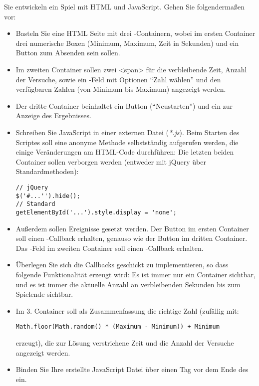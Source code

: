 %
\par Sie entwickeln ein Spiel mit HTML und JavaScript. Gehen Sie folgendermaßen vor:
%
\begin{itemize}
\item Basteln Sie eine HTML Seite mit drei -Containern, wobei im ersten Container drei numerische Boxen (Minimum, Maximum, Zeit in Sekunden) und ein Button zum Absenden sein sollen.
\item Im zweiten Container sollen zwei <span> für die verbleibende Zeit, Anzahl der Versuche, sowie ein -Feld mit Optionen ``Zahl wählen'' und den verfügbaren Zahlen (von Minimum bis Maximum) angezeigt werden.
\item Der dritte Container beinhaltet ein Button (``Neustarten'') und ein  zur Anzeige des Ergebnisses.
\item Schreiben Sie JavaScript in einer externen Datei (\emph{*.js}). Beim Starten des Scriptes soll eine anonyme Methode selbstständig aufgerufen werden, die einige Veränderungen am HTML-Code durchführen: Die letzten beiden Container sollen verborgen werden (entweder mit jQuery über Standardmethoden):
%
\begin{lstlisting}
// jQuery
$('#...'').hide();
// Standard
getElementById('...').style.display = 'none';
\end{lstlisting}
%
\item Außerdem sollen Ereignisse gesetzt werden. Der Button im ersten Container soll einen -Callback erhalten, genauso wie der Button im dritten Container. Das -Feld im zweiten Container soll einen -Callback erhalten.
\item Überlegen Sie sich die Callbacks geschickt zu implementieren, so dass folgende Funktionalität erzeugt wird: Es ist immer nur ein Container sichtbar, und es ist immer die aktuelle Anzahl an verbleibenden Sekunden bis zum Spielende sichtbar.
\item Im 3. Container soll als Zusammenfassung die richtige Zahl (zufällig mit:
%
\begin{lstlisting}
Math.floor(Math.random() * (Maximum - Minimum)) + Minimum
\end{lstlisting}
%
erzeugt), die zur Lösung verstrichene Zeit und die Anzahl der Versuche angezeigt werden.
\item Binden Sie Ihre erstellte JavaScript Datei über einen  Tag vor dem Ende des  ein.
\end{itemize}